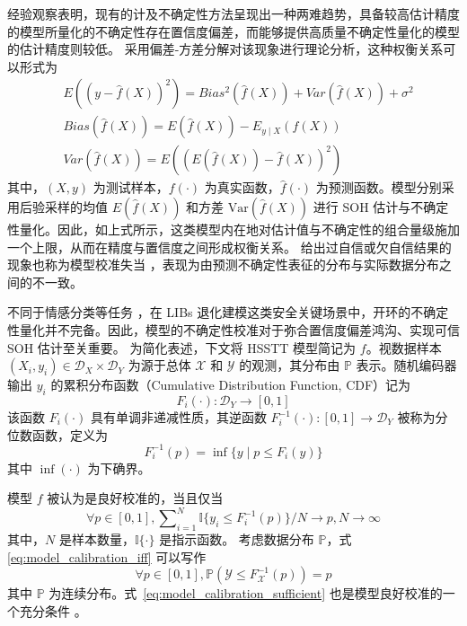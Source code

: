 经验观察表明，现有的计及不确定性方法呈现出一种两难趋势，具备较高估计精度的模型所量化的不确定性存在置信度偏差，而能够提供高质量不确定性量化的模型的估计精度则较低。
% 
采用偏差-方差分解对该现象进行理论分析，这种权衡关系可以形式为
\begin{align}
\label{eq:bias_variance_tradeoff} & E((y-\hat{f}(X))^{2}) = Bias^{2}(\hat{f}(X))+Var(\hat{f}(X))+\sigma^{2} \\
\label{eq:bias} & Bias(\hat{f}(X)) = E(\hat{f}(X))-E_{y \mid X}(f(X)) \\
\label{eq:variance} & Var(\hat{f}(X)) = E((E(\hat{f}(X))-\hat{f}(X))^{2})
\end{align}
%
其中，$(X,y)$ 为测试样本，$f(\cdot)$ 为真实函数，$\hat{f}(\cdot)$ 为预测函数。模型分别采用后验采样的均值 $E(\hat{f}(X))$ 和方差 $\text{Var}(\hat{f}(X))$ 进行 SOH 估计与不确定性量化。因此，如上式所示，这类模型内在地对估计值与不确定性的组合量级施加一个上限，从而在精度与置信度之间形成权衡关系。
% 
给出过自信或欠自信结果的现象也称为模型校准失当 \cite{kuleshov2018accurate}，表现为由预测不确定性表征的分布与实际数据分布之间的不一致。

不同于情感分类等任务 \cite{20230613569727}，在 LIBs 退化建模这类安全关键场景中，开环的不确定性量化并不完备。因此，模型的不确定性校准对于弥合置信度偏差鸿沟、实现可信 SOH 估计至关重要。
% 
为简化表述，下文将 HSSTT 模型简记为 $f$。视数据样本 $(X_i,y_i) \in \mathcal{D}_X \times \mathcal{D}_Y$ 为源于总体 $\mathcal{X}$ 和 $\mathcal{Y}$ 的观测，其分布由 $\mathbb{P}$ 表示。随机编码器输出 $y_i$ 的累积分布函数（Cumulative Distribution Function, CDF）记为 
% 
\begin{equation}
  F_i(\cdot): \mathcal{D}_Y \rightarrow [0,1]
\end{equation}
% 
该函数 $F_i(\cdot)$ 具有单调非递减性质，其逆函数 $F_i^{-1}(\cdot): [0,1] \rightarrow \mathcal{D}_Y$ 被称为分位数函数，定义为
% 
\begin{equation}
  F_i^{-1}(p)=\inf\{y \mid p \leq F_i(y)\}
\end{equation}
% 
其中 $\inf(\cdot)$ 为下确界。

模型 $f$ 被认为是良好校准的，当且仅当
% 
\begin{equation}
\forall p \in [0,1], \sum\nolimits_{i=1}^{N} \mathbb{I}\{y_{i}\leq F_{i}^{-1}(p)\}/N\rightarrow p,N\rightarrow\infty
\label{eq:model_calibration_iff}
\end{equation}
%
其中，$N$ 是样本数量，$\mathbb{I}\{\cdot\}$ 是指示函数。
考虑数据分布 $\mathbb{P}$，式 \eqref{eq:model_calibration_iff} 可以写作
\begin{equation}
\forall p\in[0,1], \mathbb{P}(\mathcal{Y}\leq F_{\mathcal{X}}^{-1}(p))=p
\label{eq:model_calibration_sufficient}
\end{equation}%
其中 $\mathbb{P}$ 为连续分布。式~\eqref{eq:model_calibration_sufficient} 也是模型良好校准的一个充分条件 \cite{kuleshov2018accurate}。

